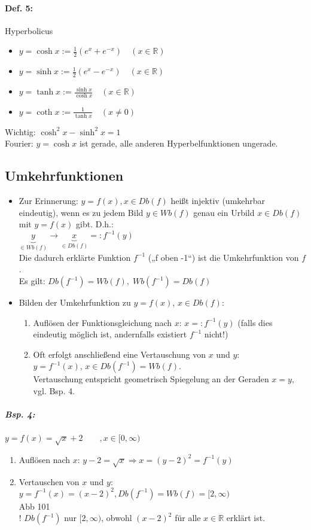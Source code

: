 \paragraph{Def. 5:}Hyperbolicus
\begin{itemize}
\item $y=\cosh x := \frac{1}{2}(e^x+e^{-x}) \quad  (x \in \mathbb{R})$
\item $y=\sinh x := \frac{1}{2}(e^x-e^{-x}) \quad  (x \in \mathbb{R})$
\item $y=\tanh x := \frac{\sinh x}{\cosh x} \quad  (x \in \mathbb{R})$
\item $y=\coth x := \frac{1}{\tanh x} \quad  (x \not = 0)$
\end{itemize}
Wichtig: $\cosh^2 x-\sinh^2 x = 1$\\
Fourier: $y=\cosh x$ ist gerade, alle anderen Hyperbelfunktionen ungerade.
\subsection{Umkehrfunktionen}
\begin{itemize}
\item Zur Erinnerung: $y=f(x), x\in Db(f)$ heißt injektiv (umkehrbar eindeutig), wenn es zu jedem Bild $y \in Wb(f)$ genau ein Urbild $x\in Db(f)$ mit $y=f(x)$ gibt. D.h.:\\
$\underbrace{y}_{\in Wb(f)} \to \underbrace{x}_{\in Db(f)} =: f^{-1}(y)$\\
Die dadurch erklärte Funktion $f^{-1}$ („f oben -1“) ist die Umkehrfunktion von $f$.\\
Es gilt: $\boxed{Db\left(f^{-1}\right) = Wb(f)}, \; Wb\left( f^{-1}\right)= Db(f)$
\item Bilden der Umkehrfunktion zu $y=f(x)$, $x \in Db(f)$:
\begin{enumerate}
\item Auflösen der Funktionsgleichung nach $x$: $x=:f^{-1}(y)$ (falls dies eindeutig möglich ist, andernfalls existiert $f^{-1}$ nicht!)
\item Oft erfolgt anschließend eine Vertauschung von $x$ und $y$:\\
$y=f^{-1}(x)$, $x \in Db(f^{-1})=Wb(f)$.\\
Vertauschung entspricht geometrisch Spiegelung an der Geraden $x=y$, vgl. Bsp. 4.
\end{enumerate}
\end{itemize}
\subparagraph{Bsp. 4:} \parskp
$y=f(x)=\sqrt{x}+2 \qquad , x \in [0,\infty)$
\begin{enumerate}
\item Auflösen nach $x$: $y-2=\sqrt{x}\Rightarrow x=(y-2)^2=f^{-1}(y)$
\item Vertauschen von $x$ und $y$: $y=f^{-1}(x)=(x-2)^2, Db(f^{-1})=Wb(f)=[2,\infty)$\\
Abb 101\\
! $Db(f^{-1})$ nur $[2,\infty)$, obwohl $(x-2)^2$ für alle $x \in \mathbb{R}$ erklärt ist.
\end{enumerate}

